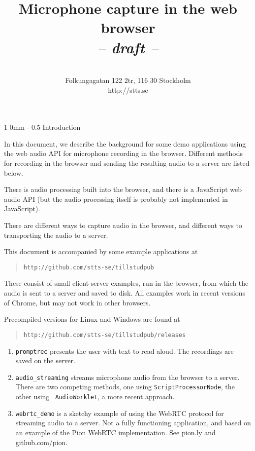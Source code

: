 \documentclass[11pt, a4paper, twoside]{article}
\title{ Microphone capture in the web browser \\ \em -- draft -- }
\author{ \stts \\
  Folkungagatan 122 2tr, 116 30 Stockholm\\
  http://stts.se }
\makeatletter
\renewcommand{\section}{\@startsection
  {section}%
  {1}%
  {0mm}%
  {-\baselineskip}%
  {0.5\baselineskip}%
  {\bfseries\sffamily\Large}}%
\makeatother
\begin{document}
\maketitle
\cfoot{\thepage (\pageref{LastPage})}  

\tableofcontents

\newpage

\section{Introduction}

In this document, we describe the background for some demo
applications using the web audio API for microphone recording in the
browser.  Different methods for recording in the browser and sending
the resulting audio to a server are listed below. 

There is audio processing built into the browser, and there is a
JavaScript web audio API (but the audio processing itself is probably not
implemented in JavaScript).

There are different ways to capture audio in the browser, and
different ways to transporting the audio to a server.

This document is accompanied by some example applications at
\begin{quote}
  \tt http://github.com/stts-se/tillstudpub    
\end{quote}



These consist of small client-server
examples, run in the browser, from which the audio is sent to a server
and saved to disk. All examples work in recent versions of Chrome, but
may not work in other browsers.

Precompiled versions for Linux and Windows are found at 
\begin{quote}
\tt http://github.com/stts-se/tillstudpub/releases
\end{quote}



\begin{enumerate}
\item {\tt promptrec} presents the user with text to read aloud. The
  recordings are saved on the server.

\item {\tt audio\_streaming} streams microphone audio from the browser
  to a server. There are two competing methods, one
  using { \tt ScriptProcessorNode}, the other using {\tt
    AudioWorklet}, a more recent approach.

\item {\tt webrtc\_demo} is a sketchy example of using the WebRTC
  protocol for streaming audio to a server. Not a fully functioning
  application, and based on an example of the Pion WebRTC implementation.
  See pion.ly and github.com/pion.
  
\end{enumerate}
\end{document}
